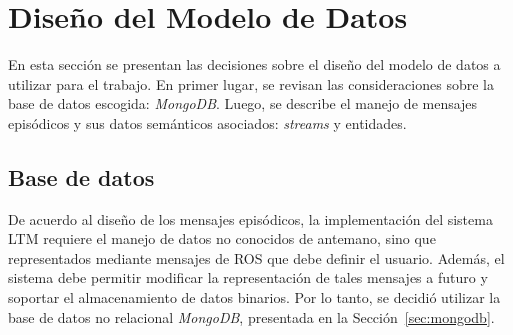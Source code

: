 
\section{Diseño del Modelo de Datos}\label{sec:data_model_design}

En esta sección se presentan las decisiones sobre el diseño del modelo de datos a utilizar para el trabajo. En primer lugar, se revisan las consideraciones sobre la base de datos escogida: \textit{MongoDB}. Luego, se describe el manejo de mensajes episódicos y sus datos semánticos asociados: \textit{streams} y entidades.


\subsection{Base de datos}

De acuerdo al diseño de los mensajes episódicos, la implementación del sistema LTM requiere el manejo de datos no conocidos de antemano, sino que representados mediante mensajes de ROS que debe definir el usuario. Además, el sistema debe permitir modificar la representación de tales mensajes a futuro y soportar el almacenamiento de datos binarios. Por lo tanto, se decidió utilizar la base de datos no relacional \textit{MongoDB}, presentada en la Sección~\ref{sec:mongodb}. 

